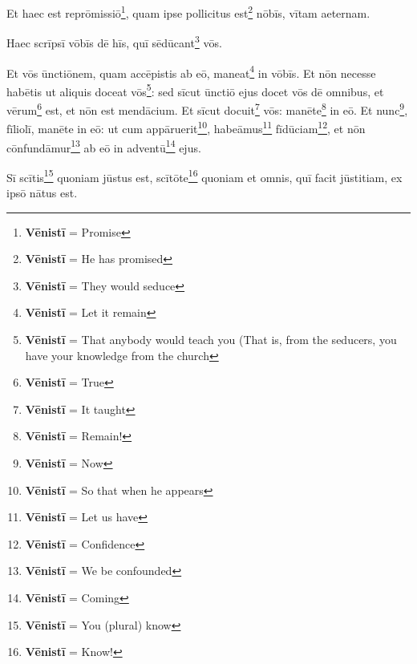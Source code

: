  Et haec est reprōmissiō\footnote{\textbf{Vēnistī} = Promise}, quam ipse pollicitus est\footnote{\textbf{Vēnistī} = He has promised} nōbīs, vītam aeternam.

 Haec scrīpsī vōbīs dē hīs, quī sēdūcant\footnote{\textbf{Vēnistī} = They would seduce} vōs.

 Et vōs ūnctiōnem, quam accēpistis ab eō, maneat\footnote{\textbf{Vēnistī} = Let it remain} in vōbīs. Et nōn necesse habētis ut aliquis doceat vōs\footnote{\textbf{Vēnistī} = That anybody would teach you (That is, from the seducers, you have your knowledge from the church}: sed sīcut ūnctiō ejus docet vōs dē omnibus, et vērum\footnote{\textbf{Vēnistī} = True} est, et nōn est mendācium. Et sīcut docuit\footnote{\textbf{Vēnistī} = It taught} vōs: manēte\footnote{\textbf{Vēnistī} = Remain!} in eō.
 Et nunc\footnote{\textbf{Vēnistī} = Now}, fīliolī, manēte in eō: ut cum appāruerit\footnote{\textbf{Vēnistī} = So that when he appears}, habeāmus\footnote{\textbf{Vēnistī} = Let us have} fīdūciam\footnote{\textbf{Vēnistī} = Confidence}, et nōn cōnfundāmur\footnote{\textbf{Vēnistī} = We be confounded} ab eō in adventū\footnote{\textbf{Vēnistī} = Coming} ejus.

 Sī scītis\footnote{\textbf{Vēnistī} = You (plural) know} quoniam jūstus est, scītōte\footnote{\textbf{Vēnistī} = Know!} quoniam et omnis, quī facit jūstitiam, ex ipsō nātus est.


